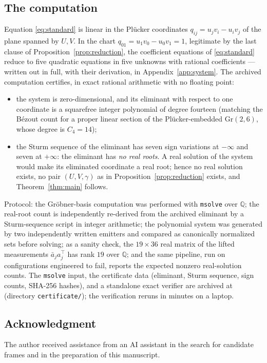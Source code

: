 \documentclass[10pt]{amsart}
\begin{document}
\subsection*{The computation}
Equation \eqref{eq:standard} is linear in the Pl\"ucker coordinates
$q_{ij}=u_jv_i-u_iv_j$ of the plane spanned by $U,V$. In the chart
$q_{01}=u_1v_0-u_0v_1=1$, legitimate by the last clause of
Proposition~\ref{prop:reduction}, the coefficient equations of
\eqref{eq:standard} reduce to five quadratic equations in five
unknowns with rational coefficients --- written out in full, with
their derivation, in Appendix~\ref{app:system}. The archived
computation \cite{Artifacts} certifies, in exact rational arithmetic
with no floating point:
\begin{itemize}
\item the system is zero-dimensional, and its eliminant with respect
to one coordinate is a squarefree integer polynomial of degree
fourteen (matching the B\'ezout count for a proper linear section of
the Pl\"ucker-embedded $\mathrm{Gr}(2,6)$, whose degree is
$C_4=14$);
\item the Sturm sequence of the eliminant has seven sign variations
at $-\infty$ and seven at $+\infty$: the eliminant has \emph{no real
roots}. A real solution of the system would make its eliminated
coordinate a real root; hence no real solution exists, no pair
$(U,V,\gamma)$ as in Proposition~\ref{prop:reduction} exists, and
Theorem~\ref{thm:main} follows.
\end{itemize}
Protocol: the Gr\"obner-basis computation was performed with
\texttt{msolve} \cite{msolve} over $\mathbb Q$; the real-root count is
independently re-derived from the archived eliminant by a
Sturm-sequence script in integer arithmetic; the polynomial system was
generated by two independently written emitters and compared as
canonically normalized sets before solving; as a sanity check, the
$19\times36$ real matrix of the lifted measurements
$\bar a_ja_j^{\top}$ has rank $19$ over $\mathbb Q$; and the same
pipeline, run on configurations engineered to fail, reports the
expected nonzero real-solution counts. The \texttt{msolve} input, the
certificate data (eliminant, Sturm sequence, sign counts, SHA-256
hashes), and a standalone exact verifier are archived at
\cite{Artifacts} (directory \texttt{certificate/}); the verification
reruns in minutes on a laptop.

\subsection*{Acknowledgment}
The author received assistance from an AI assistant in the search for
candidate frames and in the preparation of this manuscript.
\end{document}
